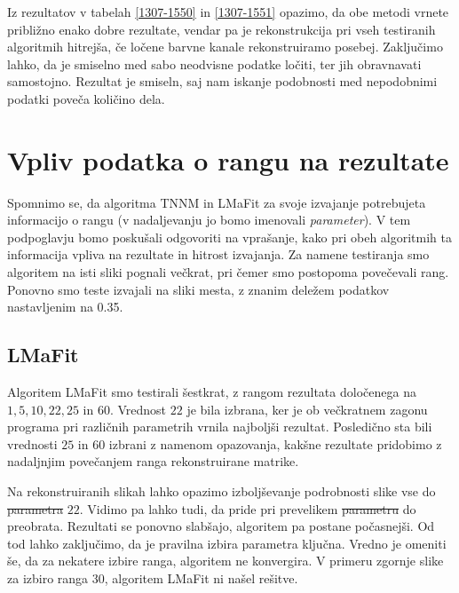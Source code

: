 Iz rezultatov v  tabelah \ref{1307-1550} in \ref{1307-1551} opazimo, da obe metodi vrnete približno enako dobre rezultate, vendar pa je rekonstrukcija pri vseh testiranih algoritmih hitrejša, če ločene barvne kanale rekonstruiramo posebej. Zaključimo lahko, da je smiselno med sabo neodvisne podatke ločiti, ter jih obravnavati samostojno. Rezultat je smiseln, saj nam iskanje podobnosti med nepodobnimi podatki poveča količino dela.


\section{Vpliv podatka o rangu na rezultate} \label{1307-2253}
Spomnimo se, da algoritma TNNM in LMaFit za svoje izvajanje potrebujeta informacijo o rangu (v nadaljevanju jo bomo imenovali \textit{parameter}). V tem podpoglavju bomo poskušali odgovoriti na vprašanje, kako pri obeh algoritmih ta informacija vpliva na rezultate in hitrost izvajanja. Za namene testiranja smo algoritem na isti sliki pognali večkrat, pri čemer smo postopoma povečevali rang. Ponovno smo teste izvajali na sliki mesta, z znanim deležem podatkov nastavljenim na 0.35.

\subsection{LMaFit}
Algoritem LMaFit smo testirali šestkrat, z rangom rezultata določenega na
$1, 5, 10, 22, 25$ in $60$. Vrednost $22$ je bila izbrana, ker je ob večkratnem zagonu programa pri različnih parametrih vrnila najboljši rezultat. Posledično sta bili vrednosti $25$ in $60$ izbrani z namenom opazovanja, kakšne rezultate pridobimo z nadaljnjim povečanjem ranga rekonstruirane matrike.



Na rekonstruiranih slikah lahko opazimo izboljševanje podrobnosti slike vse do \st{parametra} $22$. Vidimo pa lahko tudi, da pride pri prevelikem \st{parametru} do preobrata. Rezultati se ponovno slabšajo, algoritem pa postane počasnejši. Od tod lahko zaključimo, da je pravilna izbira parametra ključna. Vredno je omeniti še, da za nekatere izbire ranga, algoritem ne konvergira. V primeru zgornje slike za izbiro ranga $30$, algoritem LMaFit ni našel rešitve.

